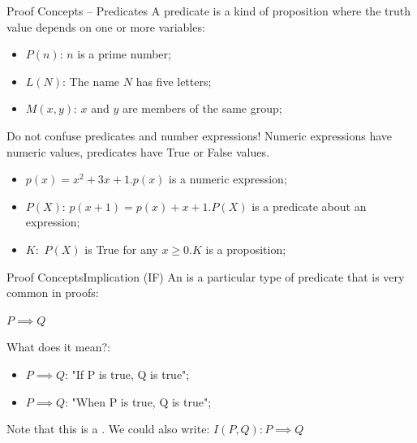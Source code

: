\begin{frame}{Proof Concepts -- Predicates}
  A predicate is a kind of proposition where the truth value depends on one or more variables:\bigskip

  \begin{itemize}
    \item $P(n)$: $n$ is a prime number;
    \item $L(N)$: The name $N$ has five letters;
    \item $M(x,y)$: $x$ and $y$ are members of the same group;
  \end{itemize}\vfill

  \begin{alertblock}{Do not confuse predicates and number expressions!}
    Numeric expressions have numeric values, predicates have True or False values.
    \begin{itemize}
      \item $p(x) = x^2 + 3x + 1$.\hfill $p(x)$ is a numeric expression;
      \item $P(X)$: $p(x+1) = p(x) + x + 1$.\hfill $P(X)$ is a predicate about an expression;
      \item $K:$ $P(X)$ is True for any $x \geq 0$.\hfill $K$ is a proposition;
    \end{itemize}
  \end{alertblock}
\end{frame}

\begin{frame}[t]{Proof Concepts}{Implication (IF)}
  An  is a particular type of predicate that is very common in proofs:
  \begin{center}
    $P \implies Q$
  \end{center}
  What does it mean?:
  \begin{itemize}
    \item $P \implies Q$: "If P is true, Q is true";
    \item $P \implies Q$: "When P is true, Q is true";
  \end{itemize}\medskip
  Note that this is a . We could also write: $I(P, Q): P \implies Q$
\end{frame}


